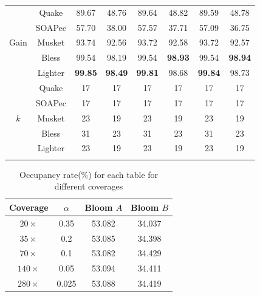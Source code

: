 \documentclass{bmcart}
\begin{document}
\begin{backmatter}
\begin{table}[h!]
\begin{tabular}{|c|c|c|c|c|c|c|c|}
		&	Quake&	89.67&	48.76&	89.64&	48.82&	89.59&	48.78	\\ \cline{2-8}
		& SOAPec&	57.70& 	38.00& 	57.57&	37.71&	57.09&	36.75 	\\ \cline{2-8}
Gain	&	Musket&	93.74&	92.56&	93.72&	92.58&	93.72&	92.57	\\ \cline{2-8}
		&	Bless&	99.54&	98.19&	99.54&	\textbf{98.93}&	99.54&	\textbf{98.94}	\\ \cline{2-8}
		&	Lighter&\textbf{99.85}&	\textbf{98.49}&	\textbf{99.81}&	98.68&	\textbf{99.84}&	98.73	\\ \hhline{|=|=|=|=|=|=|=|=|}
		
		&Quake	&17	&17	&17	&17	&17	&17 \\ \cline{2-8}
		&SOAPec	&17	&17	&17	&17	&17	&17 \\ \cline{2-8}
$k$		&Musket	&23	&19	&23	&19	&23	&19 \\ \cline{2-8}
		&Bless	&31	&23	&31	&23	&31	&23 \\ \cline{2-8}
		&Lighter	&23	&19	&23	&19	&23	&19 \\ \hhline{|=|=|=|=|=|=|=|=|}
\end{tabular}
\end{table}


\begin{table}[h!] %
\caption{Occupancy rate(\%) for each table for different coverages}
\begin{tabular}{|c|c|c|c|}\hline
Coverage & $\alpha$ & Bloom $A$ & Bloom $B$ \\ \hline
$20\times$	& 0.35 & 53.082 & 34.037 \\ \hline
$35\times$ & 0.2 & 53.085 &34.398\\ \hline
$70\times$ & 0.1 &53.082 & 34.429 \\ \hline
$140\times$ & 0.05 & 53.094 &34.411  \\ \hline
$280\times$ & 0.025 & 53.088 &34.419\\ \hline
\end{tabular}
\end{table}


\end{backmatter}
\end{document}
